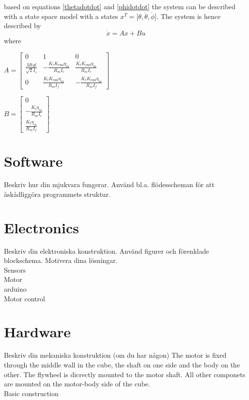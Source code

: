\documentclass[a4paper,11pt]{kth-mag}
\begin{document}
based on equations \eqref{thetadotdot} and \eqref{phidotdot} the system can be described with a state space model with a states $x^T = [\theta, \dot{\theta}, \dot{\phi}$]. The system is hence described by
\begin{equation}
\dot{x} = Ax + Bu
\end{equation} 
where \\
\begin{center}
$A =\begin{bmatrix}
0 & 1 & 0 \\
\frac{Mt g l }{\sqrt{2} I_c} & - \frac{K_t K_{\text{emf}} \eta_m}{R_m I_c} & \frac{K_t K_{\text{emf}} \eta_m}{R_m I_c} \\ 
0 & \frac{K_t K_{\text{emf}} \eta_m}{R_m I_f} & -\frac{K_t K_{\text{emf}} \eta_m}{R_m I_f}
\end{bmatrix}$

$B = \begin{bmatrix}
0 \\ 
-\frac{K_t \eta_m}{R_m I_c} \\
\frac{K_t \eta_m}{R_m I_f}
\end{bmatrix} $
\end{center}


\section{Software}
Beskriv hur din mjukvara fungerar. Använd bl.a. flödesscheman för att åskådliggöra programmets struktur.

\section{Electronics}
Beskriv din elektroniska konstruktion. Använd figurer och förenklade blockschema. Motivera dina lösningar.
\\ Sensors
\\ Motor
\\ arduino
\\ Motor control


\section{Hardware}
Beskriv din mekaniska konstruktion (om du har någon)
The motor is fixed through the middle wall in the cube, the shaft on one side and the body on the other. The flywheel is dicrectly mounted to the motor shaft. All other componets are mounted on the motor-body side of the cube.
\\ Basic construction
\end{document}
